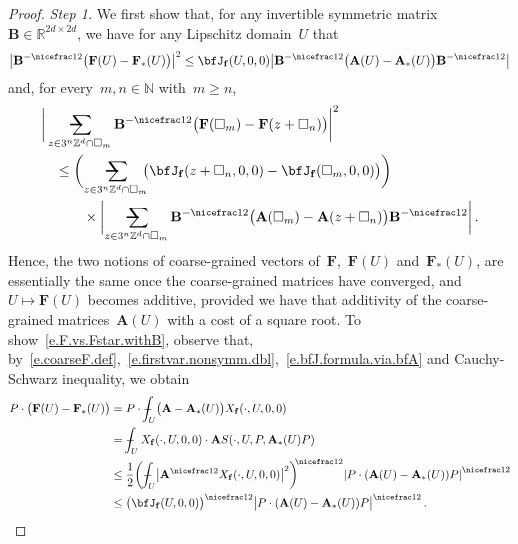 \documentclass[11pt,twoside]{article} %
\makeatletter
\let\oldsquare\square %
\renewcommand{\square}{\oldsquare}
\numberwithin{equation}{section}
\theoremstyle{definition}
\let\originalleft\left
\let\originalright\right
\renewcommand{\left}{\mathopen{}\mathclose\bgroup\originalleft}
\renewcommand{\right}{\aftergroup\egroup\originalright}
\newcommand*{\N}{\ensuremath{\mathbb{N}}}
\newcommand*{\Z}{\ensuremath{\mathbb{Z}}}
\newcommand*{\R}{\ensuremath{\mathbb{R}}}
\newcommand{\f}{\mathbf{f}}
\newcommand{\cu}{\square}
\newcommand{\avsum}{\mathop{\mathpalette\avsuminner\relax}\displaylimits}
\newcommand\avsuminner[2]{%
  {\sbox0{$\m@th#1\sum$}%
   \vphantom{\usebox0}%
   \ooalign{%
     \hidewidth
     \smash{\,\rule[.23em]{8.8pt}{1.1pt} \relax}%
     \hidewidth\cr
   ~$\m@th#1\sum$\cr
   }%
  }%
}
\def\Xint#1{\mathchoice
{\XXint\displaystyle\textstyle{#1}}%
{\XXint\textstyle\scriptstyle{#1}}%
{\XXint\scriptstyle\scriptscriptstyle{#1}}%
{\XXint\scriptscriptstyle\scriptscriptstyle{#1}}%
\!\int}
\def\XXint#1#2#3{{\setbox0=\hbox{$#1{#2#3}{\int}$}
\vcenter{\hbox{$#2#3$}}\kern-.5\wd0}}
\def\fint{\Xint-}
\newcommand{\bfA}{\mathbf{A}}
\newcommand{\bfF}{\mathbf{F}}
\makeatother
\begin{document}
\begin{proof}

\emph{Step 1.} We first show that, for any invertible symmetric matrix~$\mathbf{B} \in \R^{2d \times 2d}$, we have for any Lipschitz domain~$U$ that
\begin{equation} 
\label{e.F.vs.Fstar.withB}
\bigl| \mathbf{B}^{-\nicefrac12}\bigl(\bfF(U) - \bfF_*(U)   \bigr) \bigr|^2
\leq
\bfJ_{\f}(U,0,0) \bigl| \mathbf{B}^{-\nicefrac12} \bigl( \bfA(U) - \bfA_*(U) \bigr)\mathbf{B}^{-\nicefrac12} \bigr|
\end{equation}
and, for every~$m,n \in \N$ with~$m\geq n$, 
\begin{align} 
\label{e.f.coarseF.additive}
\lefteqn{
\bigg| \avsum_{z \in 3^n \Z^d \cap \cu_m} \mathbf{B}^{-\nicefrac12}  \bigl( \bfF(\cu_m) -   \bfF(z+\cu_n)   \bigr) \bigg|^2 
} \quad &
\notag \\ &
\leq
\biggl(\avsum_{z \in 3^n \Z^d \cap \cu_m} \!\! \bigl( \bfJ_{\f}(z+\cu_n, 0,0)  - \bfJ_{\f}(\cu_m, 0,0) \bigr)\biggr)
\notag \\ & \qquad \times
 \biggl| \avsum_{z \in 3^n \Z^d \cap \cu_m} \mathbf{B}^{-\nicefrac12}  \bigl( \bfA(\cu_m) -  \bfA(z+\cu_n) \bigr)\mathbf{B}^{-\nicefrac12}   \biggr|
\,.
\end{align}
Hence, the two notions of coarse-grained vectors of~$\bfF$,~$\bfF(U)$ and~$\bfF_*(U)$,  are essentially the same once the coarse-grained matrices have converged, and~$U \mapsto \bfF(U)$ becomes additive, provided we have that additivity of the coarse-grained matrices~$\bfA(U)$ with a cost of a square root. To show~\eqref{e.F.vs.Fstar.withB}, observe that, by~\eqref{e.coarseF.def},~\eqref{e.firstvar.nonsymm.dbl},~\eqref{e.bfJ.formula.via.bfA} and Cauchy-Schwarz inequality, we obtain
\begin{align} \label{e.F.vs.Fstar}
P\cdot \bigl(\bfF(U) - \bfF_*(U)   \bigr)
& =
P\cdot \fint_{U} \bigl( \bfA - \bfA_*(U)  \bigr) X_{\f}(\cdot,U,0,0) 
\notag \\ & 
=   \fint_{U} X_{\f}(\cdot,U,0,0) \cdot \bfA S (\cdot,U,P,\bfA_*(U) P) 
\notag \\ & 
\leq 
\frac12 \left( \fint_{U} \bigl| \bfA^{\nicefrac12}X_{\f}(\cdot,U,0,0) \bigr|^2 \right)^{\!\!\nicefrac12} 
\left| P\cdot ( \bfA(U) - \bfA_*(U)) P \right|^{\nicefrac12} 
\notag \\ & 
\leq 
\bigl( \bfJ_{\f}(U,0,0) \bigr)^{\nicefrac12} \bigl| P\cdot ( \bfA(U) - \bfA_*(U)) P \bigr|^{\nicefrac12}
\,.
\end{align}

\smallskip


\end{proof}
\end{document}
